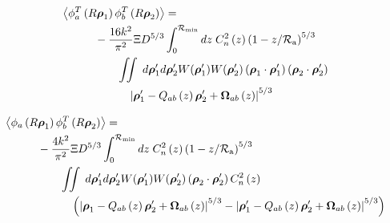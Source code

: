 \begin{equation}\label{tphase_n7}
\begin{aligned}
&\left\langle \phi^{T}_{a}\left(R\boldsymbol{\rho}_{1}\right) \phi^{T}_{b}\left(R\boldsymbol{\rho}_{2}\right)\right\rangle = \\
&\quad\quad\quad
-\frac{16k^{2}}{\pi^{2}} 
\Xi D^{5/3}
\int_{0}^{\mathcal{R}_{\rm min}} dz\;C_{n}^{2}\left(z\right) \left(1 - z/\mathcal{R}_{\rm a}\right)^{5/3}\\
& \quad\quad\quad\quad\quad
\iint \; d\boldsymbol{\rho}^{\prime}_{1}d\boldsymbol{\rho}^{\prime}_{2} W(\boldsymbol{\rho}^{\prime}_{1}) W(\boldsymbol{\rho}^{\prime}_{2})
\left(\boldsymbol{\rho}_{1} \cdot \boldsymbol{\rho}^{\prime}_{1}\right)
\left(\boldsymbol{\rho}_{2} \cdot \boldsymbol{\rho}^{\prime}_{2}\right)
\\
&\quad\quad\quad\quad\quad\quad
\left\vert \boldsymbol{\rho}^{\prime}_{1} - Q_{ab}\left(z\right) \boldsymbol{\rho}^{\prime}_{2} + \boldsymbol{\Omega}_{ab}\left(z\right)\right\vert^{5/3}
\end{aligned}
\end{equation}

\begin{equation}\label{tprphase_n7}
\begin{aligned}
&\left\langle \phi_{a}\left(R\boldsymbol{\rho}_{1}\right) \phi^{T}_{b}\left(R\boldsymbol{\rho}_{2}\right)\right\rangle = \\
&\quad\quad\quad
-\frac{4k^{2}}{\pi^{2}} 
\Xi D^{5/3}
\int_{0}^{\mathcal{R}_{\rm min}} dz\;C_{n}^{2}\left(z\right) \left(1 - z/\mathcal{R}_{\rm a}\right)^{5/3}\\
& \quad\quad\quad\quad\quad
\iint  \; d\boldsymbol{\rho}^{\prime}_{1}d\boldsymbol{\rho}^{\prime}_{2} W(\boldsymbol{\rho}^{\prime}_{1}) W(\boldsymbol{\rho}^{\prime}_{2})
\left(\boldsymbol{\rho}_{2} \cdot \boldsymbol{\rho}^{\prime}_{2}\right)
C_{n}^{2}\left(z\right) 
\\
&\quad\quad\quad\quad\quad\quad
\left(
\left\vert \boldsymbol{\rho}_{1} - Q_{ab}\left(z\right)\boldsymbol{\rho}^{\prime}_{2} + \boldsymbol{\Omega}_{ab}\left(z\right) \right\vert^{5/3}
- \left\vert \boldsymbol{\rho}^{\prime}_{1}  -  Q_{ab}\left(z\right)\boldsymbol{\rho}^{\prime}_{2} + \boldsymbol{\Omega}_{ab}\left(z\right)  \right\vert^{5/3}
\right)
\end{aligned}
\end{equation}

